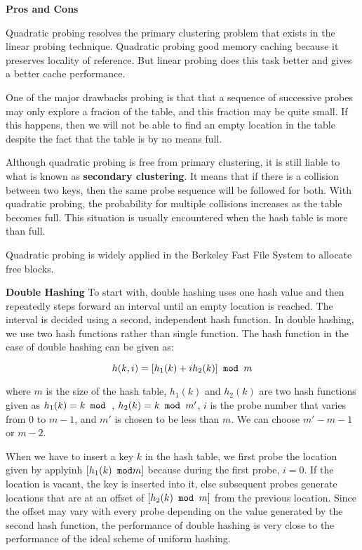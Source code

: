\vskip 3mm
{\bf Pros and Cons}

\vskip 1mm
Quadratic probing resolves the primary clustering problem that exists in the linear probing technique. Quadratic probing good memory caching because it preserves locality of reference. But linear probing does this task better and gives a better cache performance.

\vskip 1mm
One of the major drawbacks probing is that that a sequence of successive probes may only explore a fracion of the table, and this fraction may be quite small. If this happens, then we will not be able to find an empty location in the table despite the fact that the table is by no means full.

\vskip 1mm
Although quadratic probing is free from primary clustering, it is still liable to what is known as {\bf secondary clustering}. It means that if there is a collision between two keys, then the same probe sequence will be followed for both. With quadratic probing, the probability for multiple collisions increases as the table becomes full. This situation is usually encountered when the hash table is more than full.

\vskip 1mm
Quadratic probing is widely applied in the Berkeley Fast File System to allocate free blocks.

\vskip 3mm
{\bf Double Hashing}
\vskip 1mm
To start with, double hashing uses one hash value and then repeatedly steps forward an interval until an empty location is reached. The interval is decided using a second, independent hash function. In double hashing, we use two hash functions rather than single function. The hash function in the case of double hashing can be given as:

$$h(k,i)=[h_1(k)+ih_2(k)]\hbox{\tt{} mod } m$$

where $m$ is the size of the hash table, $h_1(k)$ and $h_2(k)$ are two hash functions given as $h_1(k)=k\hbox{\tt{} mod }$, $h_2(k)=k\hbox{\tt{} mod } m'$, $i$ is the probe number that varies from $0$ to $m-1$, and $m'$ is chosen to be less than $m$. We can choose $m'-m-1$ or $m-2$.

\vskip 1mm
When we have to insert a key $k$ in the hash table, we first probe the location given by applyinh $[h_1(k)\hbox{\tt{} mod} m]$ because during the first probe, $i=0$. If the location is vacant, the key is inserted into it, else subsequent probes generate locations that are at an offset of $[h_2(k)\hbox{\tt{} mod } m]$ from the previous location. Since the offset may vary with every probe depending on the value generated by the second hash function, the performance of double hashing is very close to the performance of the ideal scheme of uniform hashing.

